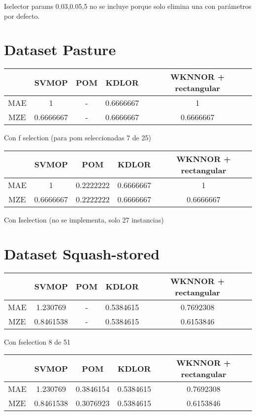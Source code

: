 Iselector params 0.03,0.05,5 no se incluye porque solo elimina una con parámetros por defecto.

\section{Dataset Pasture}

\begin{tabular}{ c c c c c }
	& SVMOP & POM & KDLOR & WKNNOR + rectangular \\
	\hline	
	MAE &   1  & - & 0.6666667 &  1 \\
	MZE &	0.6666667 & - & 0.6666667 & 0.6666667  \\
	\hline  
\end{tabular}

Con f selection (para pom seleccionadas 7 de 25)

\begin{tabular}{ c c c c c }
	& SVMOP & POM & KDLOR & WKNNOR + rectangular \\
	\hline	
	MAE &   1  & 0.2222222 & 0.6666667 &  1 \\
	MZE &	0.6666667 & 0.2222222 & 0.6666667 & 0.6666667  \\
	\hline  
\end{tabular}

Con Iselection (no se implementa, solo 27 instancias)

\section{Dataset Squash-stored}

\begin{tabular}{ c c c c c }
	& SVMOP & POM & KDLOR & WKNNOR + rectangular \\
	\hline	
	MAE &   1.230769  & - & 0.5384615  &  0.7692308 \\
	MZE &	0.8461538 & - & 0.5384615 & 0.6153846 \\
	\hline  
\end{tabular}

Con fselection 8 de 51

\begin{tabular}{ c c c c c }
	& SVMOP & POM & KDLOR & WKNNOR + rectangular \\
	\hline	
	MAE &   1.230769  & 0.3846154 & 0.5384615  &  0.7692308 \\
	MZE &	0.8461538 & 0.3076923 & 0.5384615 & 0.6153846 \\
	\hline  
\end{tabular}

